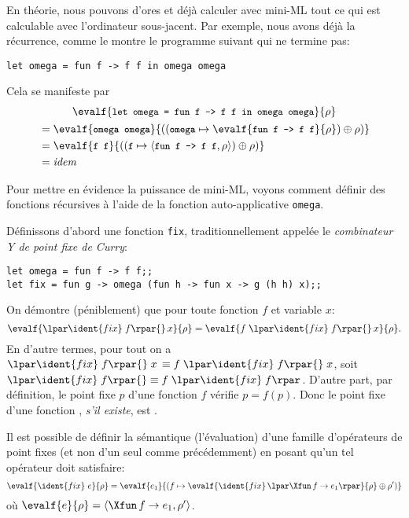 
En théorie, nous pouvons d'ores et déjà calculer avec mini-ML tout ce
qui est calculable avec l'ordinateur sous-jacent. Par exemple, nous
avons déjà la récurrence, comme le montre le programme suivant qui ne
termine pas:
\begin{center}
\verb|let omega = fun f -> f f in omega omega|
\end{center}
Cela se manifeste par
\begin{gather*}
\evalf{\texttt{\small let omega = fun f -> f f in omega omega}}{\rho}\\
\begin{align*}
&= \evalf{\texttt{\small omega omega}}{((\texttt{\small omega} \mapsto
\evalf{\texttt{\small fun f -> f f}}{\rho}) \oplus \rho)}\\
&= \evalf{\texttt{\small f f}}{((\texttt{\small f} \mapsto
    \langle\texttt{\small fun f -> f f},\rho\rangle) \oplus \rho)}\\
&= \textnormal{\emph{idem}}
\end{align*}
\end{gather*}


Pour mettre en évidence la puissance de mini-ML, voyons comment
définir des fonctions récursives à l'aide de la fonction
auto-applicative \texttt{\small omega}.

Définissons d'abord une fonction \texttt{\small fix},
traditionnellement appelée le \emph{combinateur Y de point fixe de
Curry}:
\begin{verbatim}
let omega = fun f -> f f;;
let fix = fun g -> omega (fun h -> fun x -> g (h h) x);;
\end{verbatim}

On démontre (péniblement) que pour toute fonction $f$ et variable $x$:
\begin{equation*}
\evalf{\lpar\ident{fix} \; f\rpar{} \, x}{\rho} = \evalf{f \;
  \lpar\ident{fix} \; f\rpar{} \, x}{\rho}.
\end{equation*}
En d'autre termes, pour tout  on a $\lpar\ident{fix} \;
f\rpar{} \; x \, \equiv f \; \lpar\ident{fix} \; f\rpar{} \; x$, soit
$\lpar\ident{fix} \; f\rpar{} \equiv f \; \lpar\ident{fix} \;
f\rpar$. D'autre part, par définition, le point fixe $p$ d'une
fonction $f$ vérifie $p = f(p)$. Donc le point fixe d'une fonction
, \emph{s'il existe}, est \lpar{} \rpar{}.

Il est possible de définir la sémantique (l'évaluation) d'une famille
d'opérateurs de point fixes (et non d'un seul comme précédemment) en
posant qu'un tel opérateur doit satisfaire:
\begin{equation*}
\evalf{\ident{fix} \,\, e}{\rho} = \evalf{e_1}{(f \mapsto
  \evalf{\ident{fix} \, \lpar\Xfun \, f \rightarrow e_1\rpar}{\rho}
  \oplus \rho')}
\end{equation*}
où $\evalf{e}{\rho} = \langle\Xfun \, f \rightarrow e_1,\rho'\rangle$.


